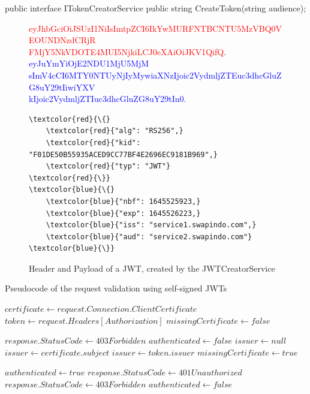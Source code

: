 \noindent \begin{minipage}{\linewidth}
	\begin{CsCode}[label={lst:ITokenCreatorService}, caption={ITokenCreatorService interface, which is injected to the API Controllers},captionpos=b]
		public interface ITokenCreatorService {
			public string CreateToken(string audience);
		}
	\end{CsCode}
\end{minipage}

\begin{figure}
	\begin{centering}
	\end{centering}
	\textcolor{red}{eyJhbGciOiJSUzI1NiIsImtpZCI6IkYwMURFNTBCNTU5MzVBQ0VEOUNDNzdCRjR\\FMjY5NkVDOTE4MUI5NjkiLCJ0eXAiOiJKV1QifQ}.
	\textcolor{blue}{eyJuYmYiOjE2NDU1MjU5MjM\\sImV4cCI6MTY0NTUyNjIyMywiaXNzIjoic2VydmljZTEuc3dhcGluZG8uY29tIiwiYXV\\kIjoic2VydmljZTIuc3dhcGluZG8uY29tIn0}.
	\\ 
	\begin{Verbatim}[commandchars=\\\{\}]
\textcolor{red}{\{} 
	\textcolor{red}{"alg": "RS256",}
	\textcolor{red}{"kid": "F01DE50B55935ACED9CC77BF4E2696EC9181B969",}
	\textcolor{red}{"typ": "JWT"} 
\textcolor{red}{\}}
\textcolor{blue}{\{} 
	\textcolor{blue}{"nbf": 1645525923,}
	\textcolor{blue}{"exp": 1645526223,}
	\textcolor{blue}{"iss": "service1.swapindo.com",}
	\textcolor{blue}{"aud": "service2.swapindo.com"} 
\textcolor{blue}{\}}
	\end{Verbatim}
	\caption{Header and Payload of a JWT, created by the JWTCreatorService}
	\label{fig:jwt_en_decoded}
\end{figure}

\begin{algorithm}[H]
	\caption{Pseudocode of the request validation using self-signed JWTs}\label{alg:jwt}
	\begin{algorithmic}
		\State $certificate \gets request.Connection.ClientCertificate$
		\State $token \gets request.Headers[Authorization]$
		\State $missingCertificate \gets false$

		\State $response.StatusCode \gets 403Forbidden$
		\State $authenticated \gets false$
		\Else
		\State $issuer \gets null$
		\State $issuer \gets certificate.subject$
		\EndIf
		\EndIf
		\Else
		\State $issuer \gets token.issuer$
		\Else
		\State $missingCertificate \gets true$
		\EndIf
		\EndIf

		\State $authenticated \gets true$
		\Else
		\State $response.StatusCode \gets 401Unauthorized$
		\Else
		\State $response.StatusCode \gets 403Forbidden$
		\EndIf
		\State $authenticated \gets false$
		\EndIf
		\EndIf
	\end{algorithmic}
\end{algorithm}

